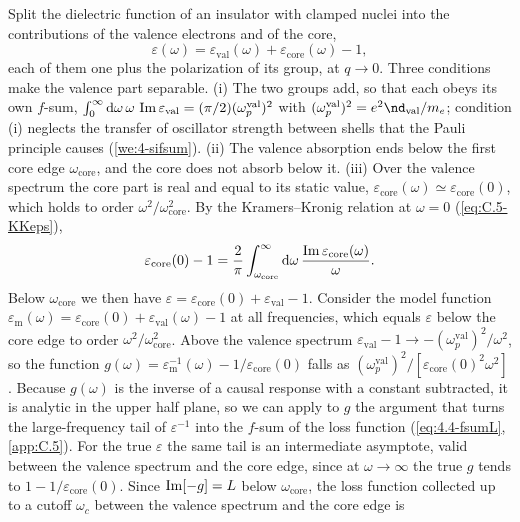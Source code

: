 Split the dielectric function of an insulator with clamped nuclei into the contributions of the valence electrons and of the core,
\begin{equation*}
  \varepsilon(\omega) = \varepsilon_{\mathrm{val}}(\omega) + \varepsilon_{\mathrm{core}}(\omega) - 1 ,
\end{equation*}
each of them one plus the polarization of its group, at $q \to 0$. Three conditions make the valence part separable. (i) The two groups add, so that each obeys its own $f$-sum, $\int_0^\infty\mathrm{d}\omega\,\omega\,\operatorname{Im}\varepsilon_{\mathrm{val}} = (\pi/2)(\omega_p^{\mathrm{val}})^2$ with $(\omega_p^{\mathrm{val}})^2 = e^2\nd_{\mathrm{val}}/m_e$; condition (i) neglects the transfer of oscillator strength between shells that the Pauli principle causes (\cref{we:4-sifsum}). (ii) The valence absorption ends below the first core edge $\omega_{\mathrm{core}}$, and the core does not absorb below it. (iii) Over the valence spectrum the core part is real and equal to its static value, $\varepsilon_{\mathrm{core}}(\omega) \simeq \varepsilon_{\mathrm{core}}(0)$, which holds to order $\omega^2/\omega_{\mathrm{core}}^2$. By the Kramers--Kronig relation at $\omega = 0$ (\cref{eq:C.5-KKeps}),
\begin{equation*}
  \varepsilon_{\mathrm{core}}(0) - 1 = \frac{2}{\pi}\int_{\omega_{\mathrm{core}}}^\infty\mathrm{d}\omega\,\frac{\operatorname{Im}\varepsilon_{\mathrm{core}}(\omega)}{\omega} .
\end{equation*}
Below $\omega_{\mathrm{core}}$ we then have $\varepsilon = \varepsilon_{\mathrm{core}}(0) + \varepsilon_{\mathrm{val}} - 1$. Consider the model function $\varepsilon_{\mathrm{m}}(\omega) = \varepsilon_{\mathrm{core}}(0) + \varepsilon_{\mathrm{val}}(\omega) - 1$ at all frequencies, which equals $\varepsilon$ below the core edge to order $\omega^2/\omega_{\mathrm{core}}^2$. Above the valence spectrum $\varepsilon_{\mathrm{val}} - 1 \to -(\omega_p^{\mathrm{val}})^2/\omega^2$, so the function $g(\omega) = \varepsilon_{\mathrm{m}}^{-1}(\omega) - 1/\varepsilon_{\mathrm{core}}(0)$ falls as $(\omega_p^{\mathrm{val}})^2/[\varepsilon_{\mathrm{core}}(0)^2\omega^2]$. Because $g(\omega)$ is the inverse of a causal response with a constant subtracted, it is analytic in the upper half plane, so we can apply to $g$ the argument that turns the large-frequency tail of $\varepsilon^{-1}$ into the $f$-sum of the loss function (\cref{eq:4.4-fsumL}, \cref{app:C.5}). For the true $\varepsilon$ the same tail is an intermediate asymptote, valid between the valence spectrum and the core edge, since at $\omega \to \infty$ the true $g$ tends to $1 - 1/\varepsilon_{\mathrm{core}}(0)$. Since $\operatorname{Im}[-g] = L$ below $\omega_{\mathrm{core}}$, the loss function collected up to a cutoff $\omega_c$ between the valence spectrum and the core edge is
